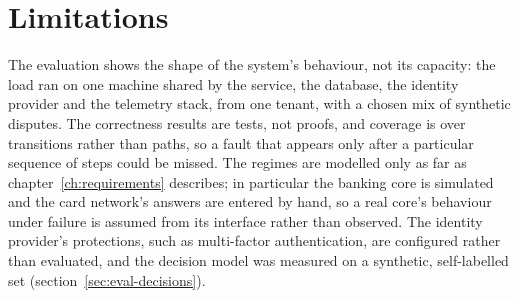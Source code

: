 \section{Limitations}
\label{sec:limitations}

The evaluation shows the shape of the system's behaviour, not its capacity: the load ran on one machine shared by
the service, the database, the identity provider and the telemetry stack, from one tenant, with a chosen mix of
synthetic disputes. The correctness results are tests, not proofs, and coverage is over transitions rather than
paths, so a fault that appears only after a particular sequence of steps could be missed. The regimes are modelled
only as far as chapter~\ref{ch:requirements} describes; in particular the banking core is simulated and the card
network's answers are entered by hand, so a real core's behaviour under failure is assumed from its interface
rather than observed. The identity provider's protections, such as multi-factor authentication, are configured
rather than evaluated, and the decision model was measured on a synthetic, self-labelled set
(section~\ref{sec:eval-decisions}).
